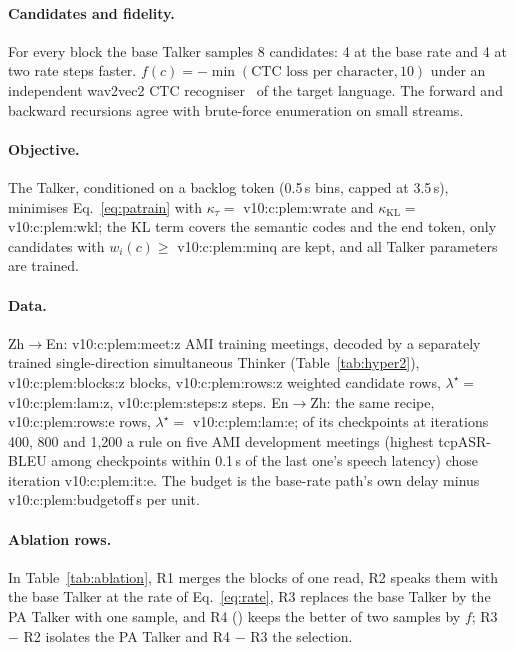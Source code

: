 \paragraph{Candidates and fidelity.} For every block the base Talker samples 8 candidates: 4 at the base rate and 4
at two rate steps faster. $f(c)=-\min(\text{CTC loss per character},10)$ under an independent wav2vec2 CTC
recogniser~\citep{baevski2020wav2vec} of the target language. The forward and backward recursions agree with
brute-force enumeration on small streams.

\paragraph{Objective.} The Talker, conditioned on a backlog token (0.5\,s bins, capped at 3.5\,s), minimises
Eq.~\eqref{eq:patrain} with $\kappa_\tau=$ \num{v10:c:plem:wrate} and $\kappa_{\mathrm{KL}}=$ \num{v10:c:plem:wkl}; the KL
term covers the semantic codes and the end token, only candidates with $w_i(c)\ge$ \num{v10:c:plem:minq} are kept, and
all Talker parameters are trained.

\paragraph{Data.} Zh$\rightarrow$En: \num{v10:c:plem:meet:z} AMI training meetings, decoded by a separately trained
single-direction simultaneous Thinker (Table~\ref{tab:hyper2}), \num{v10:c:plem:blocks:z} blocks,
\num{v10:c:plem:rows:z} weighted candidate rows, $\lambda^\star=$ \num{v10:c:plem:lam:z}, \num{v10:c:plem:steps:z}
steps. En$\rightarrow$Zh: the same recipe, \num{v10:c:plem:rows:e} rows, $\lambda^\star=$ \num{v10:c:plem:lam:e}; of its
checkpoints at iterations 400, 800 and 1{,}200 a rule on five AMI development meetings (highest tcpASR-BLEU among
checkpoints within 0.1\,s of the last one's speech latency) chose iteration \num{v10:c:plem:it:e}. The budget is the
base-rate path's own delay minus \num{v10:c:plem:budgetoff}\,s per unit.

\paragraph{Ablation rows.} In Table~\ref{tab:ablation}, R1 merges the blocks of one read, R2 speaks them with the base
Talker at the rate of Eq.~\eqref{eq:rate}, R3 replaces the base Talker by the PA Talker with one sample, and R4
(\sys{}) keeps the better of two samples by $f$; R3 $-$ R2 isolates the PA Talker and R4 $-$ R3 the selection.

